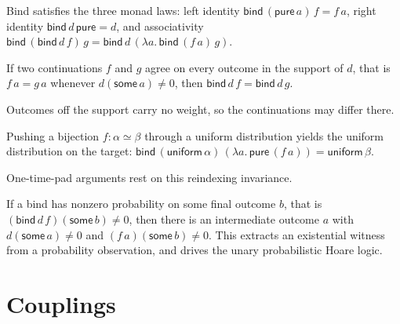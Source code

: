 \begin{lemma}
  \label{lem:sdistr-monad-laws}
  \leanok
  Bind satisfies the three monad laws: left identity
  $\mathsf{bind}\,(\mathsf{pure}\,a)\,f = f\,a$, right identity
  $\mathsf{bind}\,d\,\mathsf{pure} = d$, and associativity
  $\mathsf{bind}\,(\mathsf{bind}\,d\,f)\,g
   = \mathsf{bind}\,d\,(\lambda a.\,\mathsf{bind}\,(f\,a)\,g)$.
\end{lemma}

\begin{lemma}
  \label{lem:bind-congr-support}
  \leanok
  If two continuations $f$ and $g$ agree on every outcome in the support of
  $d$, that is $f\,a = g\,a$ whenever $d(\mathsf{some}\,a) \neq 0$, then
  $\mathsf{bind}\,d\,f = \mathsf{bind}\,d\,g$.
\end{lemma}

Outcomes off the support carry no weight, so the continuations may differ there.

\begin{lemma}
  \label{lem:uniform-bind-bij}
  \leanok
  Pushing a bijection $f : \alpha \simeq \beta$ through a uniform distribution
  yields the uniform distribution on the target:
  $\mathsf{bind}\,(\mathsf{uniform}\,\alpha)\,(\lambda a.\,\mathsf{pure}\,(f\,a))
   = \mathsf{uniform}\,\beta$.
\end{lemma}

One-time-pad arguments rest on this reindexing invariance.

\begin{lemma}
  \label{lem:bind-support-witness}
  \leanok
  If a bind has nonzero probability on some final outcome $b$, that is
  $(\mathsf{bind}\,d\,f)(\mathsf{some}\,b) \neq 0$, then there is an
  intermediate outcome $a$ with $d(\mathsf{some}\,a) \neq 0$ and
  $(f\,a)(\mathsf{some}\,b) \neq 0$. This extracts an existential witness from a
  probability observation, and drives the unary probabilistic Hoare logic.
\end{lemma}

\section{Couplings}

